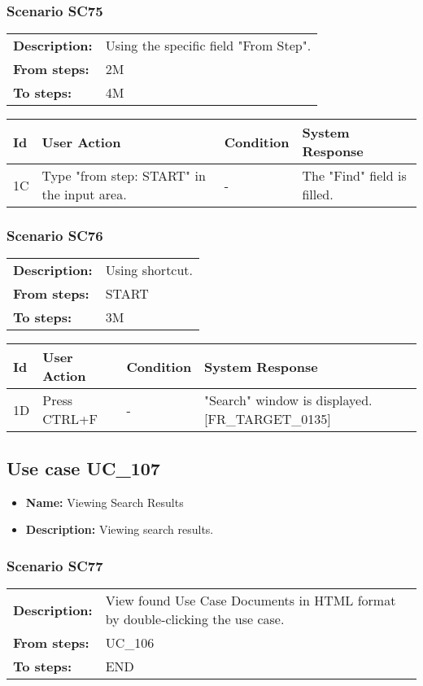 \documentclass[a4paper,11pt]{article}
\newcommand{\bl}{\\ \hline}
\begin{document}
\subsubsection*{Scenario SC75}
\begin{tabular}{p{1in}p{4in}}
{\bf Description:} & Using the specific field "From Step". \\
{\bf From steps:} & 2M \\
{\bf To steps:} & 4M \\
\end{tabular}
 
\begin{tabular}{|p{0.8in}|p{1.6in}|p{1.6in}|p{1.6in}|}
\hline
Id & User Action & Condition & System Response  \bl 
1C & Type "from step: START" in the input area. & - & The "Find" field is filled. \bl 
\end{tabular}
\subsubsection*{Scenario SC76}
\begin{tabular}{p{1in}p{4in}}
{\bf Description:} & Using shortcut. \\
{\bf From steps:} & START \\
{\bf To steps:} & 3M \\
\end{tabular}
 
\begin{tabular}{|p{0.8in}|p{1.6in}|p{1.6in}|p{1.6in}|}
\hline
Id & User Action & Condition & System Response  \bl 
1D & Press CTRL+F & - & "Search" window is displayed. [FR_TARGET_0135] \bl 
\end{tabular}
\subsection*{Use case UC_107}
\begin{itemize}
\item {\bf Name: }Viewing Search Results
\item {\bf Description: }Viewing search results.
\end{itemize}
\subsubsection*{Scenario SC77}
\begin{tabular}{p{1in}p{4in}}
{\bf Description:} & View found Use Case Documents in HTML format by
					double-clicking the use case. \\
{\bf From steps:} & UC_106#4M \\
{\bf To steps:} & END \\
\end{tabular}
 
\end{document}
